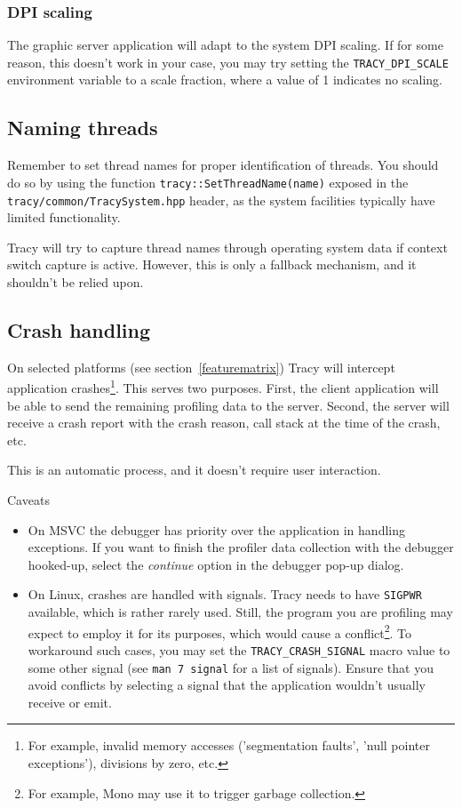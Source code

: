 \documentclass[hidelinks,titlepage,a4paper]{article}
\begin{document}
\subsubsection{DPI scaling}

The graphic server application will adapt to the system DPI scaling. If for some reason, this doesn't work in your case, you may try setting the \texttt{TRACY\_DPI\_SCALE} environment variable to a scale fraction, where a value of 1 indicates no scaling.

\subsection{Naming threads}
\label{namingthreads}

Remember to set thread names for proper identification of threads. You should do so by using the function \texttt{tracy::SetThreadName(name)} exposed in the \texttt{tracy/common/TracySystem.hpp} header, as the system facilities typically have limited functionality.

Tracy will try to capture thread names through operating system data if context switch capture is active. However, this is only a fallback mechanism, and it shouldn't be relied upon.

\subsection{Crash handling}
\label{crashhandling}

On selected platforms (see section~\ref{featurematrix}) Tracy will intercept application crashes\footnote{For example, invalid memory accesses ('segmentation faults', 'null pointer exceptions'), divisions by zero, etc.}. This serves two purposes. First, the client application will be able to send the remaining profiling data to the server. Second, the server will receive a crash report with the crash reason, call stack at the time of the crash, etc.

This is an automatic process, and it doesn't require user interaction.

\begin{bclogo}[
noborder=true,
couleur=black!5,
logo=\bcattention
]{Caveats}
\begin{itemize}
\item On MSVC the debugger has priority over the application in handling exceptions. If you want to finish the profiler data collection with the debugger hooked-up, select the \emph{continue} option in the debugger pop-up dialog.
\item On Linux, crashes are handled with signals. Tracy needs to have \texttt{SIGPWR} available, which is rather rarely used. Still, the program you are profiling may expect to employ it for its purposes, which would cause a conflict\footnote{For example, Mono may use it to trigger garbage collection.}. To workaround such cases, you may set the \texttt{TRACY\_CRASH\_SIGNAL} macro value to some other signal (see \texttt{man 7 signal} for a list of signals). Ensure that you avoid conflicts by selecting a signal that the application wouldn't usually receive or emit.
\end{itemize}
\end{bclogo}
\end{document}
